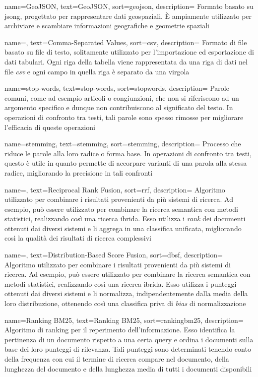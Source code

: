  {
    name=GeoJSON,
    text=GeoJSON,
    sort=geojson,
    description=
    {Formato basato su \gls{jsong}, progettato per rappresentare dati geospaziali.
    È ampiamente utilizzato per archiviare e scambiare informazioni geografiche e geometrie spaziali}
}

 {
    name=,
    text=Comma-Separated Values,
    sort=csv,
    description=
    {Formato di file basato su file di testo, solitamente utilizzato per l'importazione ed esportazione di dati tabulari.
    Ogni riga della tabella viene rappresentata da una riga di dati nel file \emph{csv} e ogni campo in quella riga è separato da una virgola}
}

 {
    name=stop-words,
    text=stop-words,
    sort=stopwords,
    description=
        {Parole comuni, come ad esempio articoli o congiunzioni, 
        che non si riferiscono ad un argomento specifico e dunque non contribuiscono al significato del testo.
        In operazioni di confronto tra testi, tali parole sono spesso rimosse per migliorare l'efficacia di queste operazioni}
}

 {
    name=stemming,
    text=stemming,
    sort=stemming,
    description=
        {Processo che riduce le parole alla loro radice o forma base.
        In operazioni di confronto tra testi, questo è utile in quanto permette di accorpare varianti di una parola alla stessa radice, 
        migliorando la precisione in tali confronti}
}

 {
    name=,
    text=Reciprocal Rank Fusion,
    sort=rrf,
    description=
        {Algoritmo utilizzato per combinare i risultati provenienti da più sistemi di ricerca. Ad esempio, può essere utilizzato per combinare la ricerca semantica con metodi statistici, realizzando così una ricerca ibrida. 
        Esso utilizza i \emph{rank} dei documenti ottenuti dai diversi sistemi e li aggrega in una classifica unificata, migliorando così la qualità dei risultati di ricerca complessivi}
}

 {
    name=,
    text=Distribution-Based Score Fusion,
    sort=dbsf,
    description=
        {Algoritmo utilizzato per combinare i risultati provenienti da più sistemi di ricerca. Ad esempio, può essere utilizzato per combinare la ricerca semantica con metodi statistici, realizzando così una ricerca ibrida. 
        Esso utilizza i punteggi ottenuti dai diversi sistemi e li normalizza, indipendentemente dalla media della loro distribuzione, ottenendo così una classifica priva di \emph{bias} di normalizzazione}
}

 {
    name=Ranking BM25,
    text=Ranking BM25,
    sort=rankingbm25,
    description=
        {Algoritmo di ranking per il reperimento dell'informazione.
        Esso identifica la pertinenza di un documento rispetto a una certa query e ordina i documenti sulla base dei loro punteggi di rilevanza. Tali punteggi sono determinati tenendo conto della frequenza con cui il termine 
        di ricerca compare nel documento, della lunghezza del documento e della lunghezza media di tutti i documenti disponibili}
}